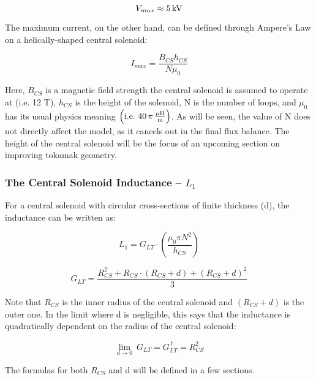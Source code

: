 \begin{equation}
	V_{max} \approx 5 \, \textnormal{kV}
\end{equation}

The maximum current, on the other hand, can be defined through Ampere's Law on a helically-shaped central solenoid: \cite{griffiths}

\begin{equation}
	I_{max} = \frac{B_{CS} h_{CS}}{N \mu_0}
\end{equation}

Here, $B_{CS}$ is a magnetic field strength the central solenoid is assumed to operate at (i.e. 12 T), $h_{CS}$ is the height of the solenoid, N is the number of loops, and $\mu_0$ has its usual physics meaning $\left( \textnormal{i.e.} \ 40 \, \pi \, \frac{ \mu \textnormal{H}}{\textnormal{m}} \right)$. As will be seen, the value of N does not directly affect the model, as it cancels out in the final flux balance. The height of the central solenoid will be the focus of an upcoming section on improving tokamak geometry.

\subsubsection{The Central Solenoid Inductance -- $L_1$}

For a central solenoid with circular cross-sections of finite thickness (d), the inductance can be written as: \cite{hartmann}

\begin{equation}
	L_1 = G_{LT} \cdot \left( \frac{\mu_0 \pi N^2}{h_{CS}} \right)
\end{equation}

\begin{equation}
	G_{LT} = \frac{R_{CS}^2 + R_{CS} \cdot ( R_{CS} + d ) + ( R_{CS} + d ) ^ 2 }{3}
\end{equation}

Note that $R_{CS}$ is the inner radius of the central solenoid and $( R_{CS} + d )$ is the outer one. In the limit where d is negligible, this says that the inductance is quadratically dependent on the radius of the central solenoid:

\begin{equation}
	\label{eq:glt_simple}
	\underset{d \to 0}{\lim} \ G_{LT} = G_{LT}^{\,\dagger} = R_{CS}^2
\end{equation}

The formulas for both $R_{CS}$ and d will be defined in a few sections.


